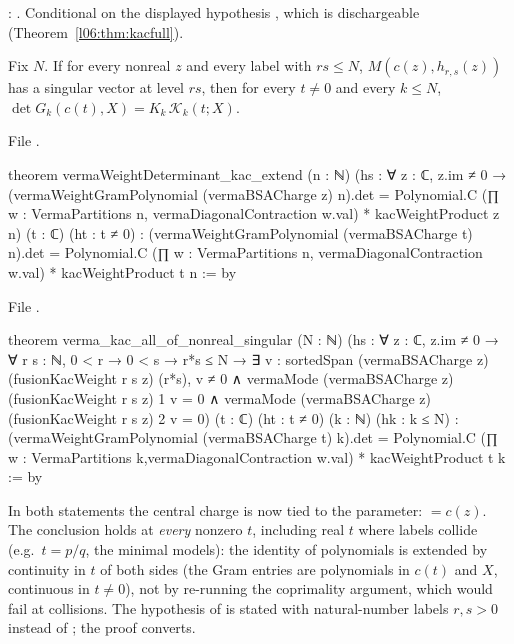 \begin{status}
\allowbreak{}\allowbreak{}\allowbreak{}\allowbreak{}\allowbreak{}\allowbreak{}\allowbreak{}:
\lean{[propext, Classical.}\allowbreak{}\allowbreak\lean{sound]}. Conditional on the displayed hypothesis , which is
dischargeable (Theorem~\ref{l06:thm:kacfull}).
\end{status}

\begin{theorem}\label{l06:thm:kacextend}
Fix $N$. If for every nonreal $z$ and every label with $rs\le N$, $M(c(z),h_{r,s}(z))$ has a singular vector
at level $rs$, then for every $t\ne0$ and every $k\le N$, $\det G_k(c(t),X) = K_k\,\mathcal K_k(t;X)$.
\end{theorem}

File .
\begin{leancode}
theorem vermaWeightDeterminant_kac_extend (n : ℕ)
    (hs : ∀ z : ℂ, z.im ≠ 0 →
      (vermaWeightGramPolynomial (vermaBSACharge z) n).det =
        Polynomial.C (∏ w : VermaPartitions n, vermaDiagonalContraction w.val) *
          kacWeightProduct z n)
    (t : ℂ) (ht : t ≠ 0) :
    (vermaWeightGramPolynomial (vermaBSACharge t) n).det =
      Polynomial.C (∏ w : VermaPartitions n, vermaDiagonalContraction w.val) *
        kacWeightProduct t n := by
\end{leancode}
File .
\begin{leancode}
theorem verma_kac_all_of_nonreal_singular (N : ℕ)
    (hs : ∀ z : ℂ, z.im ≠ 0 → ∀ r s : ℕ, 0 < r → 0 < s → r*s ≤ N →
      ∃ v : sortedSpan (vermaBSACharge z) (fusionKacWeight r s z) (r*s),
        v ≠ 0 ∧ vermaMode (vermaBSACharge z) (fusionKacWeight r s z) 1 v = 0 ∧
          vermaMode (vermaBSACharge z) (fusionKacWeight r s z) 2 v = 0)
    (t : ℂ) (ht : t ≠ 0) (k : ℕ) (hk : k ≤ N) :
    (vermaWeightGramPolynomial (vermaBSACharge t) k).det =
      Polynomial.C (∏ w : VermaPartitions k,vermaDiagonalContraction w.val) *
        kacWeightProduct t k := by
\end{leancode}

\begin{dictionary}
In both statements the central charge is now tied to the parameter:  $= c(z)$.
The conclusion holds at \emph{every} nonzero $t$, including real $t$ where labels collide (e.g.\ $t = p/q$,
the minimal models): the identity of polynomials is extended by continuity in $t$ of both sides (the Gram
entries are polynomials in $c(t)$ and $X$, continuous in $t\ne0$), not by re-running the coprimality
argument, which would fail at collisions. The hypothesis of \allowbreak{}\allowbreak{}\allowbreak{}\allowbreak{}\allowbreak{} is
stated with natural-number labels $r,s>0$ instead of ; the proof converts.
\end{dictionary}


